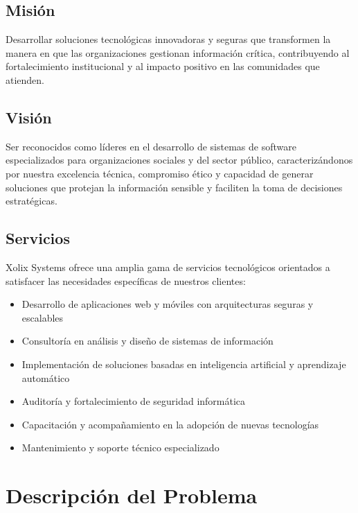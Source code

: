 \documentclass[12pt,letterpaper]{article}
\begin{document}
\subsection{Misión}

Desarrollar soluciones tecnológicas innovadoras y seguras que transformen la manera en que las organizaciones gestionan información crítica, contribuyendo al fortalecimiento institucional y al impacto positivo en las comunidades que atienden.

\subsection{Visión}

Ser reconocidos como líderes en el desarrollo de sistemas de software especializados para organizaciones sociales y del sector público, caracterizándonos por nuestra excelencia técnica, compromiso ético y capacidad de generar soluciones que protejan la información sensible y faciliten la toma de decisiones estratégicas.

\subsection{Servicios}

Xolix Systems ofrece una amplia gama de servicios tecnológicos orientados a satisfacer las necesidades específicas de nuestros clientes:

\begin{itemize}
    \item Desarrollo de aplicaciones web y móviles con arquitecturas seguras y escalables
    \item Consultoría en análisis y diseño de sistemas de información
    \item Implementación de soluciones basadas en inteligencia artificial y aprendizaje automático
    \item Auditoría y fortalecimiento de seguridad informática
    \item Capacitación y acompañamiento en la adopción de nuevas tecnologías
    \item Mantenimiento y soporte técnico especializado
\end{itemize}

\newpage

\section{Descripción del Problema}
\end{document}

